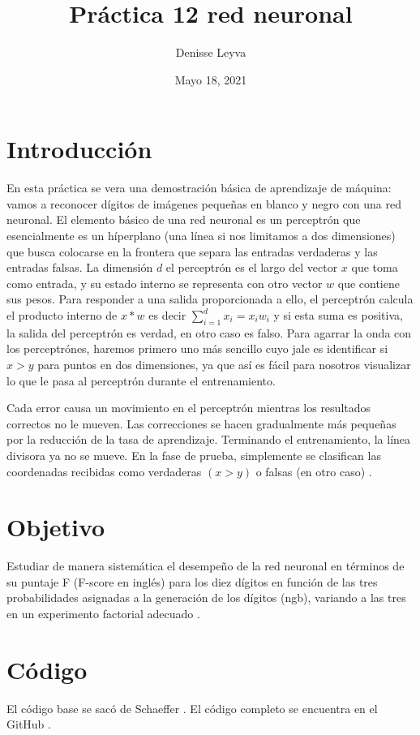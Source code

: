 \documentclass{article}
\title{Práctica 12 red neuronal}
\author{Denisse Leyva}
\date{Mayo 18, 2021}
\begin{document}
\maketitle


\section{Introducción}
En esta práctica se vera una demostración básica de aprendizaje de máquina: vamos a reconocer dígitos de imágenes pequeñas en blanco y negro con una red neuronal. El elemento básico de una red neuronal es un perceptrón que esencialmente es un híperplano (una línea si nos limitamos a dos dimensiones) que busca colocarse en la frontera que separa las entradas verdaderas y las entradas falsas. La dimensión $d$ el perceptrón es el largo del vector $x$ que toma como entrada, y su estado interno se representa con otro vector $w$ que contiene sus pesos. Para responder a una salida proporcionada a ello, el perceptrón calcula el producto interno de $x * w$ es decir $\sum_{i=1}^{d}x_{i}=x_{i}w_{i}$ y si esta suma es positiva, la salida del perceptrón es verdad, en otro caso es falso. Para agarrar la onda con los perceptrónes, haremos primero uno más sencillo cuyo jale es identificar si $x > y$ para puntos en dos dimensiones, ya que así es fácil para nosotros visualizar lo que le pasa al perceptrón durante el entrenamiento.

Cada error causa un movimiento en el perceptrón mientras los resultados correctos no le mueven. Las correcciones se hacen gradualmente más pequeñas por la reducción de la tasa de aprendizaje. Terminando el entrenamiento, la línea divisora ya no se mueve. En la fase de prueba, simplemente se clasifican las coordenadas recibidas como verdaderas $(x > y)$ o falsas (en otro caso) \cite{Satu_Elisa_Schaeffer}.

\section{Objetivo}
Estudiar de manera sistemática el desempeño de la red neuronal en términos de su puntaje F (F-score en inglés) para los diez dígitos en función de las tres probabilidades asignadas a la generación de los dígitos (ngb), variando a las tres en un experimento factorial adecuado \cite{Satu_Elisa_Schaeffer}.

\section{Código}
El código base se sacó de Schaeffer \cite{Elisa_Schaeffer}. El código completo se encuentra en el GitHub \cite{Denisse_Leyva}.
\end{document}
